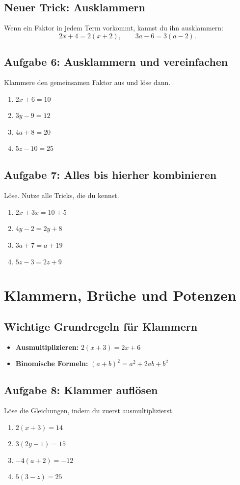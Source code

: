 \documentclass[12pt]{article}
\begin{document}
\subsection*{Neuer Trick: Ausklammern}
Wenn ein Faktor in jedem Term vorkommt, kannst du ihn ausklammern:
\[
  2x + 4 = 2(x + 2), \qquad 3a - 6 = 3(a - 2).
\]

\subsection*{Aufgabe 6: Ausklammern und vereinfachen}
Klammere den gemeinsamen Faktor aus und löse dann.
\begin{enumerate}
  \item \(2x + 6 = 10\)
  \item \(3y - 9 = 12\)
  \item \(4a + 8 = 20\)
  \item \(5z - 10 = 25\)
\end{enumerate}

\subsection*{Aufgabe 7: Alles bis hierher kombinieren}
Löse. Nutze alle Tricks, die du kennst.
\begin{enumerate}
  \item \(2x + 3x = 10 + 5\)
  \item \(4y - 2 = 2y + 8\)
  \item \(3a + 7 = a + 19\)
  \item \(5z - 3 = 2z + 9\)
\end{enumerate}

\section*{Klammern, Brüche und Potenzen}

\subsection*{Wichtige Grundregeln für Klammern}
\begin{itemize}
  \item \textbf{Ausmultiplizieren:} \(2(x + 3) = 2x + 6\)
  \item \textbf{Binomische Formeln:} \((a + b)^2 = a^2 + 2ab + b^2\)
\end{itemize}

\subsection*{Aufgabe 8: Klammer auflösen}
Löse die Gleichungen, indem du zuerst ausmultiplizierst.
\begin{enumerate}
  \item \(2(x + 3) = 14\)
  \item \(3(2y - 1) = 15\)
  \item \(-4(a + 2) = -12\)
  \item \(5(3 - z) = 25\)
\end{enumerate}
\end{document}
